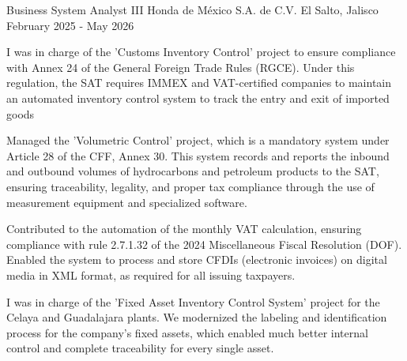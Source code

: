 \begin{cventries}
\vspace{0.5cm}
\cventry
{Business System Analyst III} %
{Honda de México S.A. de C.V.} %
{El Salto, Jalisco} %
{February 2025 - May 2026} %
{ %
	\begin{cvitems}
		\item {I was in charge of the 'Customs Inventory Control' project to ensure compliance with Annex 24 of the General Foreign Trade Rules (RGCE). Under this regulation, the SAT requires IMMEX and VAT-certified companies to maintain an automated inventory control system to track the entry and exit of imported goods}
		\item {Managed the 'Volumetric Control' project, which is a mandatory system under Article 28 of the CFF, Annex 30. This system records and reports the inbound and outbound volumes of hydrocarbons and petroleum products to the SAT, ensuring traceability, legality, and proper tax compliance through the use of measurement equipment and specialized software.}
		\item {Contributed to the automation of the monthly VAT calculation, ensuring compliance with rule 2.7.1.32 of the 2024 Miscellaneous Fiscal Resolution (DOF). Enabled the system to process and store CFDIs (electronic invoices) on digital media in XML format, as required for all issuing taxpayers.}
		\item {I was in charge of the 'Fixed Asset Inventory Control System' project for the Celaya and Guadalajara plants. We modernized the labeling and identification process for the company's fixed assets, which enabled much better internal control and complete traceability for every single asset.}
	\end{cvitems} 
}





\end{cventries}